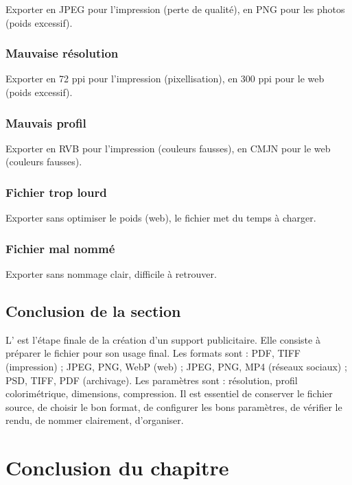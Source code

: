 Exporter en JPEG pour l'impression (perte de qualité), en PNG pour les photos (poids excessif).

\subsubsection{Mauvaise résolution}

Exporter en 72 ppi pour l'impression (pixellisation), en 300 ppi pour le web (poids excessif).

\subsubsection{Mauvais profil}

Exporter en RVB pour l'impression (couleurs fausses), en CMJN pour le web (couleurs fausses).

\subsubsection{Fichier trop lourd}

Exporter sans optimiser le poids (web), le fichier met du temps à charger.

\subsubsection{Fichier mal nommé}

Exporter sans nommage clair, difficile à retrouver.

\subsection*{Conclusion de la section}

L' est l'étape finale de la création d'un support publicitaire. Elle consiste à préparer le fichier pour son usage final. Les formats sont : PDF, TIFF (impression) ; JPEG, PNG, WebP (web) ; JPEG, PNG, MP4 (réseaux sociaux) ; PSD, TIFF, PDF (archivage). Les paramètres sont : résolution, profil colorimétrique, dimensions, compression. Il est essentiel de conserver le fichier source, de choisir le bon format, de configurer les bons paramètres, de vérifier le rendu, de nommer clairement, d'organiser.

\section*{Conclusion du chapitre}

